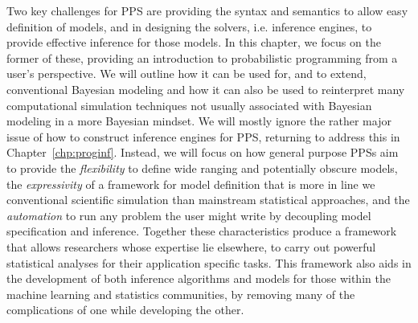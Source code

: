 Two key challenges for PPS are providing the
syntax and semantics to allow easy definition of models, and in designing the solvers, i.e.
inference engines, to provide effective inference for those models.
In this chapter, we focus on the former of these, providing an introduction to 
probabilistic programming from a user's perspective.  We will outline how it can be used for, and
to extend, conventional Bayesian modeling and how it can also be used to reinterpret many computational simulation
techniques not usually associated with Bayesian modeling in a more Bayesian mindset.
We will mostly ignore the rather major issue of how to construct inference engines for PPS, returning to address this in Chapter~\ref{chp:proginf}.
Instead, we will focus on how general purpose PPSs aim to  provide 
the \emph{flexibility} to define
wide ranging and potentially obscure models, the \emph{expressivity} of a framework for 
model definition that is more in line we conventional scientific simulation than mainstream 
statistical approaches, and the \emph{automation} to  run any problem the user might write
by decoupling model specification and inference.
Together these characteristics produce a framework that allows researchers whose expertise 
lie elsewhere, to carry out powerful statistical analyses for their application specific tasks.  
This framework also aids in the development of both inference
algorithms and models for those within the machine learning and statistics communities,
by removing many of the complications of one while developing the other.
%

